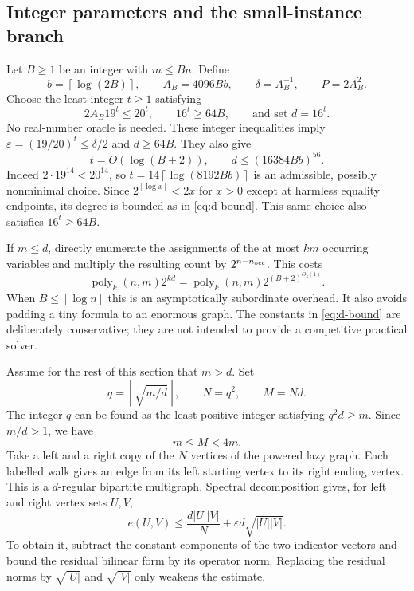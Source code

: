 \documentclass[11pt]{article}
\numberwithin{equation}{section}
\theoremstyle{definition}\newtheorem{definition}[theorem]{Definition}
\theoremstyle{remark}\newtheorem{remark}[theorem]{Remark}
\DeclareMathOperator{\poly}{poly}
\newcommand{\ceil}[1]{\left\lceil#1\right\rceil}
\begin{document}
\subsection{Integer parameters and the small-instance branch}

Let $B\ge1$ be an integer with $m\le Bn$. Define
\begin{equation}\label{eq:parameters}
 b=\ceil{\log(2B)},\qquad A_B=4096Bb,\qquad
 \delta=A_B^{-1},\qquad P=2A_B^2.
\end{equation}
Choose the least integer $t\ge1$ satisfying
\begin{equation}\label{eq:integer-tests}
 2A_B19^t\le20^t,\qquad16^t\ge64B,
 \qquad\text{and set }d=16^t.
\end{equation}
No real-number oracle is needed. These integer inequalities imply
$\varepsilon=(19/20)^t\le\delta/2$ and $d\ge64B$.
They also give
\begin{equation}\label{eq:d-bound}
 t=O(\log(B+2)),\qquad d\le(16384Bb)^{56}.
\end{equation}
Indeed $2\cdot19^{14}<20^{14}$, so
$t=14\ceil{\log(8192Bb)}$ is an admissible, possibly nonminimal
choice. Since $2^{\ceil{\log x}}<2x$ for $x>0$ except at harmless
equality endpoints, its degree is bounded as in \eqref{eq:d-bound}.
This same choice also satisfies $16^t\ge64B$.

If $m\le d$, directly enumerate the assignments of the at most
$km$ occurring variables and multiply the resulting count by
$2^{n-n_{\rm occ}}$. This costs
\begin{equation}\label{eq:small-m}
 \poly_k(n,m)2^{kd}=\poly_k(n,m)2^{(B+2)^{O_k(1)}}.
\end{equation}
When $B\le\ceil{\log n}$ this is an asymptotically subordinate
overhead. It also avoids padding a tiny formula to an enormous graph.
The constants in \eqref{eq:d-bound} are deliberately conservative;
they are not intended to provide a competitive practical solver.

Assume for the rest of this section that $m>d$. Set
\begin{equation}\label{eq:padding}
 q=\ceil{\sqrt{m/d}},\qquad N=q^2,\qquad M=Nd.
\end{equation}
The integer $q$ can be found as the least positive integer satisfying
$q^2d\ge m$. Since $m/d>1$, we have
\begin{equation}\label{eq:padding-bound}
 m\le M<4m.
\end{equation}
Take a left and a right copy of the $N$ vertices of the powered lazy
graph. Each labelled walk gives an edge from its left starting
vertex to its right ending vertex. This is a $d$-regular bipartite
multigraph. Spectral decomposition gives, for left and right vertex
sets $U,V$,
\begin{equation}\label{eq:mixing}
 e(U,V)\le \frac{d|U||V|}{N}
              +\varepsilon d\sqrt{|U||V|}.
\end{equation}
To obtain it, subtract the constant components of the two indicator
vectors and bound the residual bilinear form by its operator norm.
Replacing the residual norms by $\sqrt{|U|}$ and $\sqrt{|V|}$
only weakens the estimate.
\end{document}
